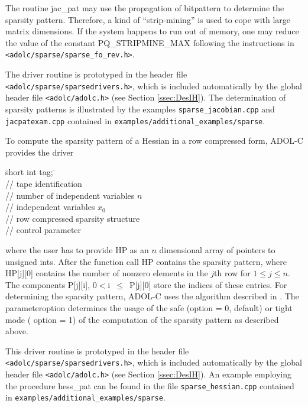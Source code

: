 \documentclass[11pt,twoside]{article}
\begin{document}
The routine {\sf jac\_pat} may use the propagation of bitpattern to
determine the sparsity pattern. Therefore, a kind of ``strip-mining'' 
is used to cope with large matrix dimensions. If the system happens to run out of memory, one may reduce 
the value of the constant {\sf PQ\_STRIPMINE\_MAX}
following the instructions in \verb=<adolc/sparse/sparse_fo_rev.h>=.

The driver routine is prototyped in the header file
\verb=<adolc/sparse/sparsedrivers.h>=, which is included automatically by the
global header file \verb=<adolc/adolc.h>= (see Section
\ref{ssec:DesIH}). The determination of sparsity patterns is
illustrated by the examples \verb=sparse_jacobian.cpp=
and \verb=jacpatexam.cpp=
contained in 
\verb=examples/additional_examples/sparse=.

To compute the sparsity pattern of a Hessian in a row compressed form, ADOL-C provides the
driver
\begin{tabbing}
\hspace{0.5in}\={\sf short int tag;} \hspace{1.3in}\= \kill    %
\\
       \> // tape identification \\
               \> // number of independent variables $n$\\
         \> // independent variables $x_0$\\
 \> // row compressed sparsity structure\\
          \> // control parameter
\end{tabbing}
where the user has to provide {\sf HP} as an $n$ dimensional array of pointers to {\sf
 unsigned int}s. 
After the function call {\sf HP} contains the sparsity pattern,
where {\sf HP[j][0]} contains the number of nonzero elements in the
 $j$th row for $1 \le j\le n$. 
The components {\sf P[j][i]}, $0<${\sf i}~$\le$~{\sf P[j][0]} store the
 indices of these entries. For determining the sparsity pattern, ADOL-C uses
 the algorithm described in \cite{Wa05a}.  The parameter{\sf option} determines
the usage of the safe ({\sf option = 0}, default) or tight mode ({\sf
  option = 1}) of the computation of the sparsity pattern as described
above.

This driver routine is prototyped in the header file
\verb=<adolc/sparse/sparsedrivers.h>=, which is included automatically by the
global header file \verb=<adolc/adolc.h>= (see Section \ref{ssec:DesIH}).
An example employing the procedure {\sf hess\_pat}  can be found in the file
\verb=sparse_hessian.cpp=  contained in 
\verb=examples/additional_examples/sparse=.
%
\end{document}
